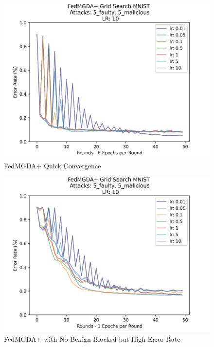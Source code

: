 \begin{figure}[htbp]
	\centering
    \includegraphics[scale=0.5]{initial/graphs/fake_good.png}
	\caption{FedMGDA+ Quick Convergence}
	\label{fig:fake_good}
\end{figure}

\begin{figure}[htbp]
	\centering
    \includegraphics[scale=0.5]{initial/graphs/1epoch_grid.png}
	\caption{FedMGDA+ with No Benign Blocked but High Error Rate}
	\label{fig:1epoch_grid}
\end{figure}

